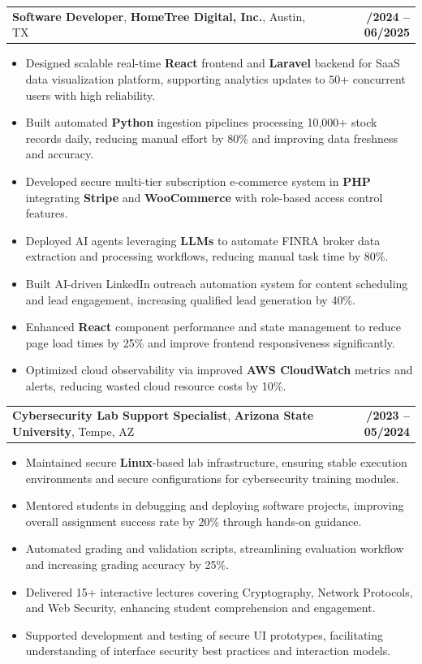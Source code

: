 \documentclass[letterpaper,10pt]{article}
\makeatletter
\newcommand{\resumeItem}[1]{
  \item{\fontsize{8pt}{9pt}\selectfont
    #1 \vspace{-3pt}
  }
}
\newcommand{\resumeSubheading}[4]{
  \vspace{-2pt}\item
    \begin{tabular*}{1.0\textwidth}[t]{l@{\extracolsep{\fill}}r}
      \textbf{\fontsize{8.5pt}{10pt}\selectfont #3}, \textbf{\fontsize{8.5pt}{10pt}\selectfont #1}, \fontsize{8.5pt}{10pt}\selectfont #4 & \textbf{\fontsize{8.5pt}{10pt}\selectfont #2} \\
    \end{tabular*}\vspace{-7pt}
}
\newcommand{\resumeItemListStart}{\begin{itemize}[leftmargin=*]}
\newcommand{\resumeItemListEnd}{\end{itemize}\vspace{-5pt}}
\makeatother
\begin{document}
    \resumeSubheading
        {HomeTree Digital, Inc.}{06/2024 – 06/2025}
        {Software Developer}{Austin, TX}
      \resumeItemListStart
        \resumeItem{Designed scalable real-time \textbf{React} frontend and \textbf{Laravel} backend for SaaS data visualization platform, supporting analytics updates to 50+ concurrent users with high reliability.}
        \resumeItem{Built automated \textbf{Python} ingestion pipelines processing 10,000+ stock records daily, reducing manual effort by 80\% and improving data freshness and accuracy.}
        \resumeItem{Developed secure multi-tier subscription e-commerce system in \textbf{PHP} integrating \textbf{Stripe} and \textbf{WooCommerce} with role-based access control features.}
        \resumeItem{Deployed AI agents leveraging \textbf{LLMs} to automate FINRA broker data extraction and processing workflows, reducing manual task time by 80\%.}
        \resumeItem{Built AI-driven LinkedIn outreach automation system for content scheduling and lead engagement, increasing qualified lead generation by 40\%.}
        \resumeItem{Enhanced \textbf{React} component performance and state management to reduce page load times by 25\% and improve frontend responsiveness significantly.}
        \resumeItem{Optimized cloud observability via improved \textbf{AWS CloudWatch} metrics and alerts, reducing wasted cloud resource costs by 10\%.}
      \resumeItemListEnd

    \resumeSubheading
        {Arizona State University}{10/2023 – 05/2024}
        {Cybersecurity Lab Support Specialist}{Tempe, AZ}
      \resumeItemListStart
        \resumeItem{Maintained secure \textbf{Linux}-based lab infrastructure, ensuring stable execution environments and secure configurations for cybersecurity training modules.}
        \resumeItem{Mentored students in debugging and deploying software projects, improving overall assignment success rate by 20\% through hands-on guidance.}
        \resumeItem{Automated grading and validation scripts, streamlining evaluation workflow and increasing grading accuracy by 25\%.}
        \resumeItem{Delivered 15+ interactive lectures covering Cryptography, Network Protocols, and Web Security, enhancing student comprehension and engagement.}
        \resumeItem{Supported development and testing of secure UI prototypes, facilitating understanding of interface security best practices and interaction models.}
      \resumeItemListEnd
\end{document}
